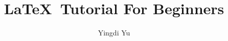 \documentclass[letterpaper,10pt]{article}
\begin{document}
\title{\LaTeX~Tutorial For Beginners}
\author{Yingdi Yu}
\date{}
\maketitle



\end{document}
